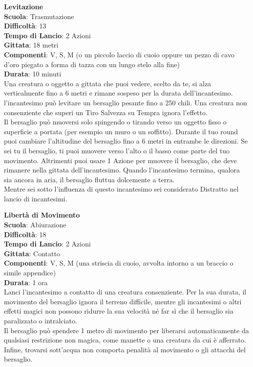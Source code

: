 \begin{multicols}{2}
\medskip\textbf{Levitazione}\\
\textbf{Scuola}: Trasmutazione\\
\textbf{Difficoltà}:  13\\
\textbf{Tempo di Lancio}: 2 Azioni\\
\textbf{Gittata}: 18 metri\\
\textbf{Componenti}: V, S, M (o un piccolo laccio di cuoio oppure un pezzo di cavo d’oro piegato a forma di tazza con un lungo stelo alla fine)\\
\textbf{Durata}: 10 minuti \\
Una creatura o oggetto a gittata che puoi vedere, scelto da te, si alza verticalmente fino a 6 metri e rimane sospeso per la durata dell'incantesimo. l'incantesimo può levitare un bersaglio pesante fino a 250 chili. Una creatura non consenziente che superi un Tiro Salvezza su Tempra ignora l’effetto.\\
Il bersaglio può muoversi solo spingendo o tirando verso un oggetto fisso o superficie a portata (per esempio un muro o un soffitto). Durante il tuo round puoi cambiare l’altitudine del bersaglio fino a 6 metri in entrambe le direzioni. Se sei tu il bersaglio, ti puoi muovere verso l’alto o il basso come parte del tuo movimento. Altrimenti puoi usare 1 Azione per muovere il bersaglio, che deve rimanere nella gittata dell'incantesimo. Quando l'incantesimo termina, qualora sia ancora in aria, il bersaglio fluttua dolcemente a terra.\\
Mentre sei sotto l'influenza di questo incantesimo sei considerato Distratto nel lancio di incantesimi.


\medskip\textbf{Libertà di Movimento}\\
\textbf{Scuola}: Abiurazione\\
\textbf{Difficoltà}:  18\\
\textbf{Tempo di Lancio}: 2 Azioni\\
\textbf{Gittata}: Contatto\\
\textbf{Componenti}: V, S, M (una striscia di cuoio, avvolta intorno a un braccio o simile appendice)\\
\textbf{Durata}: 1 ora\\
Lanci l'incantesimo a contatto di una creatura consenziente. Per la sua durata, il movimento del bersaglio ignora il terreno difficile, mentre gli incantesimi o altri effetti magici non possono ridurre la sua velocità né far sì che il bersaglio sia paralizzato o intralciato.\\
Il bersaglio può spendere 1 metro di movimento per liberarsi automaticamente da qualsiasi restrizione non magica, come manette o una creatura da cui è afferrato. Infine, trovarsi sott’acqua non comporta penalità al movimento o gli attacchi del bersaglio. 


\end{multicols}
